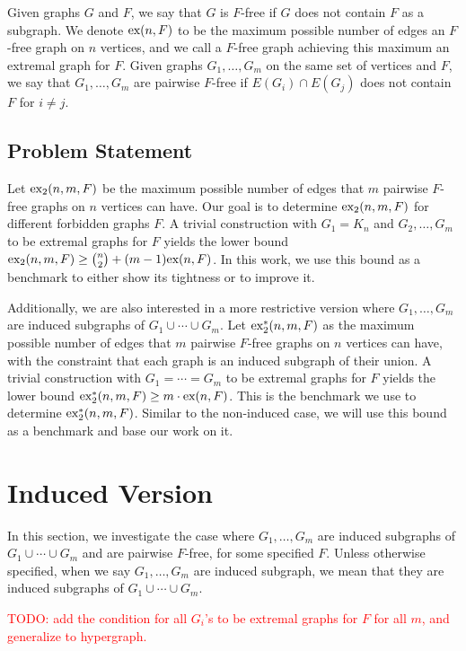 \documentclass[12pt]{report}
\newcommand*{\ex}{\textnormal{ex}}
\newcommand*{\dex}{\textnormal{ex}_2}
\begin{document}
Given graphs $G$ and $F$, we say that $G$ is $F$-free if $G$ does not contain $F$ as a subgraph. We denote $\ex(n, F)$ to be the maximum  possible number of edges an $F$-free graph on $n$ vertices, and we call a $F$-free graph achieving this maximum an extremal graph for $F$. Given graphs $G_1, \ldots, G_m$ on the same set of vertices and $F$, we say that $G_1, \ldots, G_m$ are pairwise $F$-free if $E(G_i) \cap E(G_j)$ does not contain $F$ for $i \neq j$.

\section{Problem Statement}

Let $\dex(n, m, F)$ be the maximum possible number of edges that $m$ pairwise $F$-free graphs on $n$ vertices can have. Our goal is to determine $\dex(n, m, F)$ for different forbidden graphs $F$. A trivial construction with $G_1 = K_n$ and $G_2, \ldots, G_m$ to be extremal graphs for $F$ yields the lower bound $\dex(n, m, F) \geq \binom{n}{2} + (m - 1)\ex(n, F)$. In this work, we use this bound as a benchmark to either show its tightness or to improve it.

Additionally, we are also interested in a more restrictive version where $G_1, \ldots, G_m$ are induced subgraphs of $G_1 \cup \cdots \cup G_m$. Let $\dex^*(n, m, F)$ as the maximum possible number of edges that $m$ pairwise $F$-free graphs on $n$ vertices can have, with the constraint that each graph is an induced subgraph of their union. A trivial construction with $G_1 = \cdots = G_m$ to be extremal graphs for $F$ yields the lower bound $\dex^*(n, m, F) \geq m \cdot \ex(n, F)$. This is the benchmark we use to determine $\dex^*(n, m, F)$. Similar to the non-induced case, we will use this bound as a benchmark and base our work on it.

\chapter{Induced Version}

In this section, we investigate the case where $G_1, \ldots, G_m$ are induced subgraphs of $G_1 \cup \cdots \cup G_m$ and are pairwise $F$-free, for some specified $F$. Unless otherwise specified, when we say $G_1, \ldots, G_m$ are induced subgraph, we mean that they are induced subgraphs of $G_1 \cup \cdots \cup G_m$.

\textcolor{red}{TODO: add the condition for all $G_i$'s to be extremal graphs for $F$ for all $m$, and generalize to hypergraph.}
\end{document}

